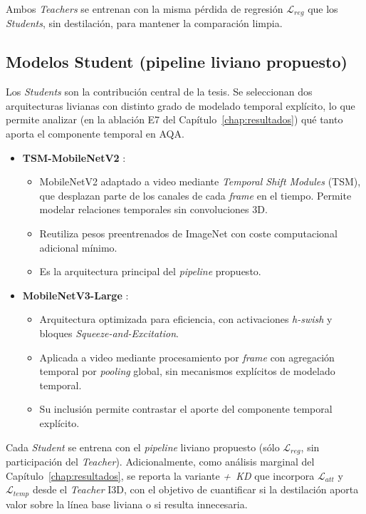 Ambos \textit{Teachers} se entrenan con la misma pérdida de regresión $\mathcal{L}_{reg}$ que los \textit{Students}, sin destilación, para mantener la comparación limpia.

\subsection{Modelos Student (pipeline liviano propuesto)}

Los \textit{Students} son la contribución central de la tesis. Se seleccionan dos arquitecturas livianas con distinto grado de modelado temporal explícito, lo que permite analizar (en la ablación E7 del Capítulo~\ref{chap:resultados}) qué tanto aporta el componente temporal en \ac{AQA}.

\begin{itemize}
    \item \textbf{TSM-MobileNetV2} \cite{Lin2019TSM,sandler2018mobilenetv2}:
        \begin{itemize}
            \item MobileNetV2 adaptado a video mediante \textit{Temporal Shift Modules} (\ac{TSM}), que desplazan parte de los canales de cada \textit{frame} en el tiempo. Permite modelar relaciones temporales sin convoluciones 3D.
            \item Reutiliza pesos preentrenados de ImageNet con coste computacional adicional mínimo.
            \item Es la arquitectura principal del \textit{pipeline} propuesto.
        \end{itemize}
    \item \textbf{MobileNetV3-Large} \cite{Howard2019MobileNetV3}:
        \begin{itemize}
            \item Arquitectura optimizada para eficiencia, con activaciones \textit{h-swish} y bloques \textit{Squeeze-and-Excitation}.
            \item Aplicada a video mediante procesamiento por \textit{frame} con agregación temporal por \textit{pooling} global, sin mecanismos explícitos de modelado temporal.
            \item Su inclusión permite contrastar el aporte del componente temporal explícito.
        \end{itemize}
\end{itemize}

Cada \textit{Student} se entrena con el \textit{pipeline} liviano propuesto (sólo $\mathcal{L}_{reg}$, sin participación del \textit{Teacher}). Adicionalmente, como análisis marginal del Capítulo~\ref{chap:resultados}, se reporta la variante \textit{+~KD} que incorpora $\mathcal{L}_{att}$ y $\mathcal{L}_{temp}$ desde el \textit{Teacher} \ac{I3D}, con el objetivo de cuantificar si la destilación aporta valor sobre la línea base liviana o si resulta innecesaria.


